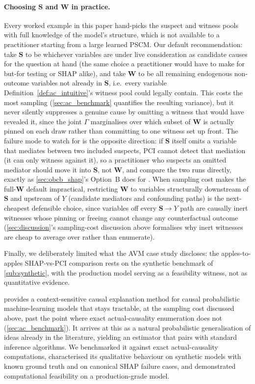 \paragraph{Choosing $\mathbf{S}$ and $\mathbf{W}$ in practice.} Every worked
example in this paper hand-picks the suspect and witness pools with full
knowledge of the model's structure, which is not available to a practitioner
starting from a large learned PSCM. Our default recommendation: take
$\mathbf{S}$ to be whichever variables are under live consideration as
candidate causes for the question at hand (the same choice a practitioner
would have to make for but-for testing or SHAP alike), and take $\mathbf{W}$
to be all remaining endogenous non-outcome variables not already in
$\mathbf{S}$, i.e.\ every variable Definition~\ref{def:ac_intuitive}'s witness
pool could legally contain. This costs the most sampling (\cref{sec:ac_benchmark}
quantifies the resulting variance), but it never silently suppresses a genuine
cause by omitting a witness that would have revealed it, since the joint
$\Gamma$ marginalises over which subset of $\mathbf{W}$ is actually pinned on
each draw rather than committing to one witness set up front. The failure
mode to watch for is the opposite direction: if $\mathbf{S}$ itself omits a
variable that mediates between two included suspects, PCI cannot detect that
mediation (it can only witness against it), so a practitioner who suspects
an omitted mediator should move it into $\mathbf{S}$, not $\mathbf{W}$, and
compare the two runs directly, exactly as \cref{sec:obcb_shap}'s Option~B does
for . When sampling cost makes the full-$\mathbf{W}$
default impractical, restricting $\mathbf{W}$ to variables structurally
downstream of $\mathbf{S}$ and upstream of $Y$ (candidate mediators and
confounding paths) is the next-cheapest defensible choice, since variables
off every $\mathbf{S}\to Y$ path are causally inert witnesses whose pinning
or freeing cannot change any counterfactual outcome (\cref{sec:discussion}'s
sampling-cost discussion above formalises why inert witnesses are cheap to
average over rather than enumerate).

Finally, we deliberately limited what the AVM case study discloses: the apples-to-apples
SHAP-vs-PCI comparison rests on the synthetic benchmark of \cref{sub:synthetic},
with the production model serving as a feasibility witness, not as quantitative
evidence.

\Ourapproach provides a context-sensitive causal explanation method for causal
probabilistic machine-learning models that stays tractable, at the sampling cost
discussed above, past the point where exact actual-causality enumeration does not
(\cref{sec:ac_benchmark}). It arrives at this as a natural probabilistic
generalisation of ideas already in the literature, yielding an estimator that
pairs with standard inference algorithms. We benchmarked it against exact
actual-causality computations, characterised its qualitative behaviour on synthetic
models with known ground truth and on canonical SHAP failure cases, and demonstrated
computational feasibility on a production-grade model.

